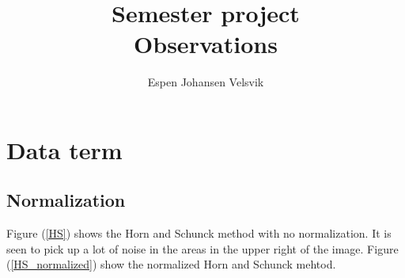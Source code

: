 \documentclass[10pt,a4paper]{article}
\begin{document}
\title{Semester project\\ Observations}
\author{Espen Johansen Velsvik}
\maketitle

%
%
%

\section{Data term}
\subsection{Normalization}
Figure (\ref{HS}) shows the Horn and Schunck method with no normalization. It is seen to pick up a lot of noise in the areas in the upper right of the image. Figure (\ref{HS_normalized}) show the normalized Horn and Schunck mehtod. 
\end{document}
